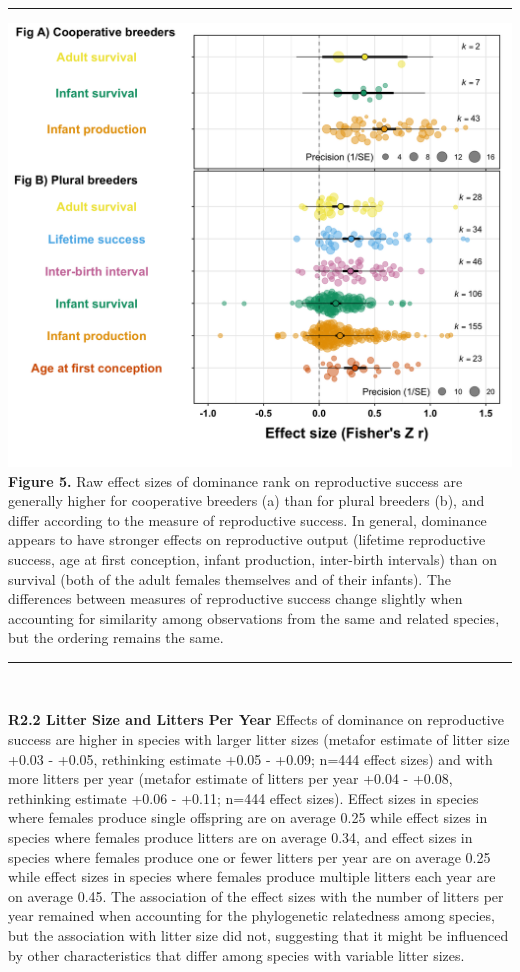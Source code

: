 \documentclass[
]{article}
\begin{document}
\begin{center}\rule{0.5\linewidth}{0.5pt}\end{center}

\includegraphics{ranksuccess_Fig5_effectsize_lifehistorymeasure.png}
\textbf{Figure 5.} Raw effect sizes of dominance rank on reproductive
success are generally higher for cooperative breeders (a) than for
plural breeders (b), and differ according to the measure of reproductive
success. In general, dominance appears to have stronger effects on
reproductive output (lifetime reproductive success, age at first
conception, infant production, inter-birth intervals) than on survival
(both of the adult females themselves and of their infants). The
differences between measures of reproductive success change slightly
when accounting for similarity among observations from the same and
related species, but the ordering remains the same.

\begin{center}\rule{0.5\linewidth}{0.5pt}\end{center}

~

\textbf{R2.2 Litter Size and Litters Per Year} Effects of dominance on
reproductive success are higher in species with larger litter sizes
(metafor estimate of litter size +0.03 - +0.05, rethinking estimate
+0.05 - +0.09; n=444 effect sizes) and with more litters per year
(metafor estimate of litters per year +0.04 - +0.08, rethinking estimate
+0.06 - +0.11; n=444 effect sizes). Effect sizes in species where
females produce single offspring are on average 0.25 while effect sizes
in species where females produce litters are on average 0.34, and effect
sizes in species where females produce one or fewer litters per year are
on average 0.25 while effect sizes in species where females produce
multiple litters each year are on average 0.45. The association of the
effect sizes with the number of litters per year remained when
accounting for the phylogenetic relatedness among species, but the
association with litter size did not, suggesting that it might be
influenced by other characteristics that differ among species with
variable litter sizes.
\end{document}
